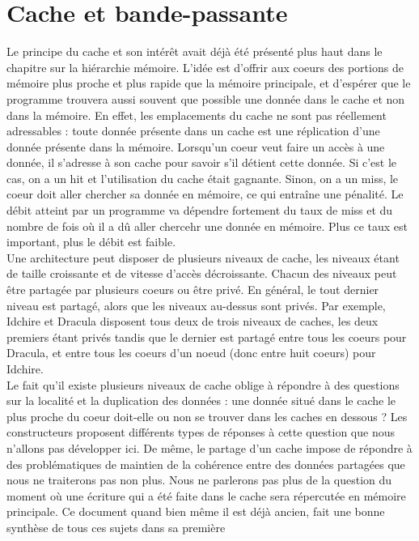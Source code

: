 \documentclass{report}
\begin{document}
\section{Cache et bande-passante}
Le principe du cache et son intérêt avait déjà été présenté plus haut dans le chapitre sur la 
hiérarchie mémoire. L'idée est d'offrir aux coeurs des portions de mémoire plus proche et plus 
rapide que la mémoire principale, et d'espérer que le programme trouvera aussi souvent que possible
une donnée dans le cache et non dans la mémoire. En effet, les emplacements du cache ne sont pas
réellement adressables : toute donnée présente dans un cache est une réplication d'une donnée
présente dans la mémoire. Lorsqu'un coeur veut faire un accès à une donnée, il s'adresse à son 
cache pour savoir s'il détient cette donnée. Si c'est le cas, on a un hit et l'utilisation du
cache était gagnante. Sinon, on a un miss, le coeur doit aller chercher sa donnée en mémoire,
ce qui entraîne une pénalité. Le débit atteint par un programme va dépendre fortement du taux
de miss et du nombre de fois où il a dû aller chercehr une donnée en mémoire. Plus ce taux est
important, plus le débit est faible.
\\Une architecture peut disposer de plusieurs niveaux de cache, les niveaux étant de taille
croissante et de vitesse d'accès décroissante. Chacun des niveaux peut être partagée par plusieurs
coeurs ou être privé. En général, le tout dernier niveau est partagé, alors que les niveaux au-dessus
sont privés. Par exemple, Idchire et Dracula disposent tous deux de trois niveaux de caches, les deux
premiers étant privés tandis que le dernier est partagé entre tous les coeurs pour Dracula, et entre
tous les coeurs d'un noeud (donc entre huit coeurs) pour Idchire.
\\Le fait qu'il existe plusieurs niveaux de cache oblige à répondre à des questions sur la localité
et la duplication des données : une donnée situé dans le cache le plus proche du coeur doit-elle ou
non se trouver dans les caches en dessous ? Les constructeurs proposent différents types de réponses
à cette question que nous n'allons pas développer ici. De même, le partage d'un cache impose de 
répondre à des problématiques de maintien de la cohérence entre des données partagées que nous ne
traiterons pas non plus. Nous ne parlerons pas plus de la question du moment où une écriture
qui a été faite dans le cache sera répercutée en mémoire principale. Ce document \cite{cachebus} 
quand bien même il est déjà ancien, fait une bonne synthèse de tous ces sujets dans sa première
\end{document}
